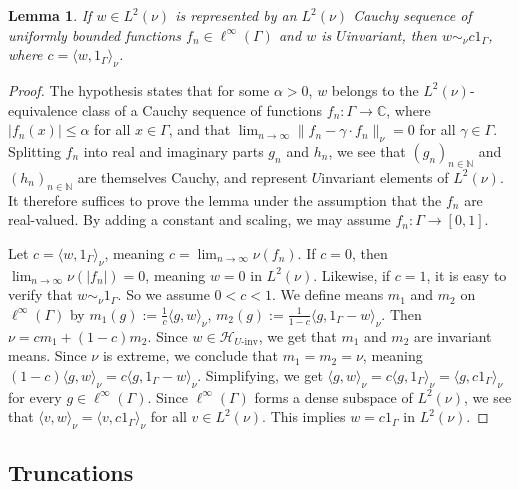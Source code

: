 \documentclass[12pt]{amsart} \usepackage{amsmath,centernot,amssymb,leftindex}
\newtheorem{lemma}[theorem]{Lemma}
\numberwithin{theorem}{section}
\numberwithin{equation}{section}
\theoremstyle{definition}
\begin{document}
	
	\begin{lemma}\label{lem:BoundedTranslationErgodicity}
		 If $w\in L^2(\nu)$ is represented by an $L^{2}(\nu)$ Cauchy sequence of  \emph{uniformly} bounded functions $f_n\in \ell^\infty(\Gamma)$ and $w$ is $U$\text{-}invariant, then $w\sim_\nu c1_\Gamma$, where $c=\langle w, 1_\Gamma\rangle_\nu$.
	\end{lemma}
	
	\begin{proof}
		The hypothesis states that for some $\alpha>0$, $w$ belongs to the $L^2(\nu)$-equivalence class of a Cauchy sequence of functions $f_n:\Gamma\to \mathbb C$, where $|f_n(x)|\leq \alpha$ for all $x\in \Gamma$, and that $\lim_{n\to\infty}\|f_n-\gamma\cdot f_n\|_{\nu}=0$ for all $\gamma\in \Gamma$.  Splitting $f_n$ into real and imaginary parts $g_{n}$ and $h_n$, we see that $(g_n)_{n\in\mathbb{N}}$ and $(h_n)_{n\in\mathbb{N}}$ are themselves Cauchy, and represent $U$\text{-}invariant elements of $L^2(\nu)$.  It therefore suffices to prove the lemma under the assumption that the $f_n$ are real-valued.  By adding a constant and scaling, we may assume $f_n:\Gamma\to [0,1]$.
		
		Let $c=\langle w, 1_\Gamma \rangle_\nu$, meaning $c=\lim_{n\to\infty} \nu(f_n)$.  If $c=0$, then $\lim_{n\to\infty} \nu(|f_n|)=0$, meaning $w=0$ in $L^2(\nu)$.  Likewise, if $c=1$, it is easy to verify that $w\sim_\nu 1_\Gamma$.  So we assume $0<c<1$.  We define means $m_1$ and $m_2$ on $\ell^\infty(\Gamma)$ by $m_1(g) := \frac{1}{c}\langle g,w\rangle_\nu$, $m_2(g):=\frac{1}{1-c}\langle g, 1_\Gamma-w\rangle_\nu$.    Then $\nu=cm_1+(1-c)m_2$.   Since $w\in \mathcal H_{U\text{-inv}}$, we get that $m_{1}$ and $m_{2}$ are invariant means.  Since $\nu$ is extreme, we conclude that $m_1=m_2=\nu$, meaning $(1-c)\langle g,w\rangle_\nu = c\langle g,1_\Gamma-w\rangle_\nu$.  Simplifying, we get $\langle g,w\rangle_\nu = c\langle g,1_\Gamma\rangle_\nu=\langle g, c1_{\Gamma}\rangle_{\nu}$ for every $g\in \ell^\infty(\Gamma)$.  Since $\ell^{\infty}(\Gamma)$ forms a dense subspace of $L^{2}(\nu)$,  we see that $\langle v,w\rangle_\nu = \langle v, c1_\Gamma\rangle_\nu$ for all $v\in L^2(\nu)$.  This implies $w=c1_{\Gamma}$ in $L^{2}(\nu)$.
	\end{proof}
	
	
\subsection{Truncations}
\end{document}
